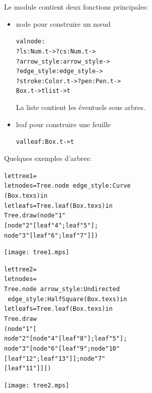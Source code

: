 \documentclass[a4paper,12pt]{article}
\begin{document}
Le module contient deux fonctions principales:
\begin{itemize}
\item node pour construire un n\oe ud
  \begin{alltt}
    val node : 
    ?ls:Num.t -> ?cs:Num.t -> 
    ?arrow_style:arrow_style -> 
    ?edge_style:edge_style -> 
    ?stroke:Color.t -> ?pen:Pen.t ->
    Box.t -> t list -> t
  \end{alltt}
  La liste contient les éventuels sous arbres.
\bigskip 

\item leaf pour construire une feuille
  \begin{alltt}
    val leaf : Box.t -> t
  \end{alltt}
\end{itemize}

Quelques exemples d'arbres:

\bigskip

\begin{minipage}{0.5\linewidth}
  \begin{alltt}
    let tree1 =
    let node s = Tree.node ~edge_style:Curve 
    (Box.tex s) in
    let leaf s = Tree.leaf (Box.tex s) in
    Tree.draw (node "1" 
    [node "2" [leaf "4"; leaf "5"]; 
      node "3" [leaf "6"; leaf "7"]])
  \end{alltt}
\end{minipage}
\begin{minipage}{0.5\linewidth}
  \begin{center}
    \texttt{[image: tree1.mps]}
  \end{center}
\end{minipage}

\bigskip

\begin{minipage}{0.5\linewidth}
  \begin{alltt}
    let tree2 =
    let node s = 
    Tree.node ~arrow_style:Undirected 
    ~edge_style:HalfSquare (Box.tex s) in
    let leaf s = Tree.leaf (Box.tex s) in
    Tree.draw 
    (node "1" [
      node "2" [node "4" [leaf "8"]; leaf "5"]; 
      node "3" [node "6" [leaf "9"; node "10" 
          [leaf "12"; leaf "13"]];node "7" 
        [leaf "11"]]])
  \end{alltt}
\end{minipage}
\begin{minipage}{0.5\linewidth}
  \begin{center}
    \texttt{[image: tree2.mps]}
  \end{center}
\end{minipage}
\end{document}
